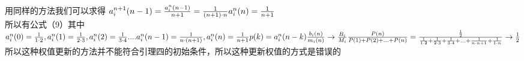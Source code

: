 \documentclass[10pt,journal,letterpaper,compsoc]{IEEEtran}
\def\a{{\alpha}}
\begin{document}
\begin{CJK}{UTF8}{gkai}
\\用同样的方法我们可以求得
$a_i^{n+1}(n-1)=\frac{a_i^n(n-1)}{n+1}=\frac{1}{(n+1) \cdot n}
\\a_i^n(n)=\frac{1}{n+1}$
\\所以有公式（9）其中
$\\a_i^n(0)=\frac{1}{1 \cdot 2},a_i^n(1)=
\frac{1}{2 \cdot 3},a_i^n(2)=\frac{1}{3 \cdot 4}....a_i^n(n-1)
=\frac{1}{n \cdot (n+1)},a_i^n(n)=\frac{1}{n+1}
\\p(k)=a_i^n(n-k)
\frac{b_i(n)}{m_i(n)} \rightarrow \frac{B_i}{M_i}
\frac{P(n)}{P(1)+P(2)+...+P(n)}=
\frac{\frac{1}{2}}{\frac{1}{1 \cdot 2}+\frac{1}{2 \cdot 3}+\frac{1}{3 \cdot 4}+...
+\frac{1}{n \cdot n+1}+\frac{1}{1 \cdot n}} \rightarrow \frac{1}{2}$
\\所以这种权值更新的方法并不能符合引理四的初始条件，所以这种更新权值的方式是错误的
\end{CJK}
\end{document}
